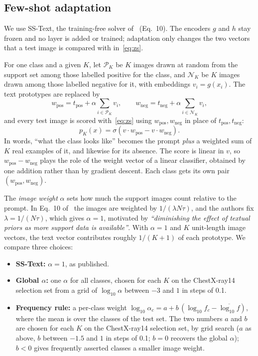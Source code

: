\documentclass[journal]{IEEEtran}
\begin{document}
\subsection{Few-shot adaptation}
We use SS-Text, the training-free solver of~\cite{silvarodriguez2025fca} (Eq.~10). The encoders $g$ and
$h$ stay frozen and no layer is added or trained; adaptation only changes the two vectors that a test
image is compared with in~\eqref{eq:zs}.

For one class and a given $K$, let $\mathcal{P}_K$ be $K$ images drawn at random from the support set
among those labelled positive for the class, and $\mathcal{N}_K$ be $K$ images drawn among those
labelled negative for it, with embeddings $v_i=g(x_i)$. The text prototypes are replaced by
\begin{equation}
w_{\mathrm{pos}} = t_{\mathrm{pos}} + \alpha\!\sum_{i\in\mathcal{P}_K} v_i, \qquad
w_{\mathrm{neg}} = t_{\mathrm{neg}} + \alpha\!\sum_{i\in\mathcal{N}_K} v_i,
\label{eq:sstext}
\end{equation}
and every test image is scored with~\eqref{eq:zs} using $w_{\mathrm{pos}}, w_{\mathrm{neg}}$ in place of
$t_{\mathrm{pos}}, t_{\mathrm{neg}}$:
\begin{equation}
p_K(x)=\sigma\!\left(v\cdot w_{\mathrm{pos}} - v\cdot w_{\mathrm{neg}}\right).
\end{equation}
In words, ``what the class looks like'' becomes the prompt \emph{plus} a weighted sum of $K$ real
examples of it, and likewise for its absence. The score is linear in $v$, so
$w_{\mathrm{pos}}-w_{\mathrm{neg}}$ plays the role of the weight vector of a linear classifier, obtained by
one addition rather than by gradient descent. Each class gets its own pair $(w_{\mathrm{pos}}, w_{\mathrm{neg}})$.

The \emph{image weight} $\alpha$ sets how much the support images count relative to the prompt. In Eq.~10
of~\cite{silvarodriguez2025fca} the images are weighted by $1/(\lambda N\tau)$, and the authors fix
$\lambda=1/(N\tau)$, which gives $\alpha=1$, motivated by \emph{``diminishing the effect of textual priors as
more support data is available''}. With $\alpha=1$ and $K$ unit-length image vectors, the text vector
contributes roughly $1/(K+1)$ of each prototype. We compare three choices:
\begin{itemize}
\item \textbf{SS-Text:} $\alpha=1$, as published.
\item \textbf{Global $\alpha$:} one $\alpha$ for all classes, chosen for each $K$ on the ChestX-ray14
selection set from a grid of $\log_{10}\alpha$ between $-3$ and $1$ in steps of 0.1.
\item \textbf{Frequency rule:} a per-class weight
$\log_{10}\alpha_c = a + b\,(\log_{10} f_c - \overline{\log_{10} f})$, where the mean is over the classes of the
test set. The two numbers $a$ and $b$ are chosen for each $K$ on the ChestX-ray14 selection set, by grid search
($a$ as above, $b$ between $-1.5$ and $1$ in steps of 0.1; $b=0$ recovers the global $\alpha$); $b<0$ gives frequently asserted classes a smaller image weight.
\end{itemize}
\end{document}
